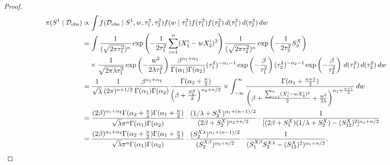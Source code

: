 \documentclass[accepted]{uai2026} %
\newcommand{\train}{\mathcal{D}}
\newcommand{\obsdata}{\train_{\text{obs}}}
\theoremstyle{boldremark}
\begin{document}
\begin{proof}
    \begin{align}
        \notag \pi(S^1\mid\obsdata) &\propto \int f(\obsdata\mid S^1, w, \tau_1^2, \tau_2^2) f(w\mid\tau_1^2)f(\tau_1^2)f(\tau_2^2)\, d(\tau_1^2)\, d(\tau_2^2)\, dw \\
        \notag &= \int \frac{1}{(\sqrt{2\pi \tau_1^2})^n}\exp \left(-\frac{1}{2\tau_1^2}\sum_{i=1}^n(X_1^{i}-wX_2^{i})^2 \right) \frac{1}{(\sqrt{2\pi \tau_2^2})^n}\exp \left(-\frac{1}{2\tau_2^2}S_2^X \right) \\
        \notag &\quad \times \frac{1}{\sqrt{2\pi\lambda\tau_1^2}}\exp\left(-\frac{w^2}{2\lambda\tau_1^2} \right) \frac{\beta^{\alpha_1+\alpha_2}}{\Gamma(\alpha_1)\Gamma(\alpha_2)} (\tau_1^2)^{-\alpha_1-1} \exp \left(-\frac{\beta}{\tau_1^2} \right) (\tau_2^2)^{-\alpha_2-1} \exp \left(-\frac{\beta}{\tau_2^2} \right)\, d(\tau_1^2)\, d(\tau_2^2)\, dw \\
        \notag &= \frac{1}{\sqrt{\lambda}} \frac{1}{(2\pi)^{n+1/2}} \frac{\beta^{\alpha_1+\alpha_2}}{\Gamma(\alpha_1)\Gamma(\alpha_2)} \frac{\Gamma(\alpha_2+\frac{n}{2})}{\left( \beta + \frac{S_2^X}{2} \right)^{\alpha_2+n/2}}\times \int_{-\infty}^\infty \frac{\Gamma(\alpha_1+\frac{n+1}{2})}{\left( \beta+ \frac{\sum_{i=1}^n(X_1^{i}-wX_2^{i})^2}{2} +\frac{w^2}{2\lambda}   \right)^{\alpha_1+\frac{n+1}{2}}} \, dw \\
        \notag &= \frac{(2\beta)^{\alpha_1+\alpha_2} \Gamma(\alpha_2+\frac{n}{2})\Gamma(\alpha_1+\frac{n}{2})}{\sqrt{\lambda} \pi^n \Gamma(\alpha_1)\Gamma(\alpha_2)} \cdot \frac{(1/\lambda + S_2^X)^{\alpha_1+(n-1)/2}}{(2\beta + S_2^X)^{\alpha_2+n/2}} \cdot \frac{1}{[(2\beta+S_1^X)(1/\lambda+S_2^X) - (S_{12}^X)^2]^{\alpha_1+n/2}}\\
        &= \frac{(2\beta)^{\alpha_1+\alpha_2} \Gamma(\alpha_2+\frac{n}{2})\Gamma(\alpha_1+\frac{n}{2})}{\sqrt{\lambda} \pi^n \Gamma(\alpha_1)\Gamma(\alpha_2)} \cdot \frac{ (S_2^{X\lambda})^{\alpha_1+(n-1)/2}}{(S_2^{X\beta})^{\alpha_2+n/2}} \cdot \frac{1}{(S_1^{X\beta} S_2^{X\lambda} - (S_{12}^X)^2)^{\alpha_1+n/2}},
        \label{eq:post_G1}
    \end{align}


\end{proof}
\end{document}
